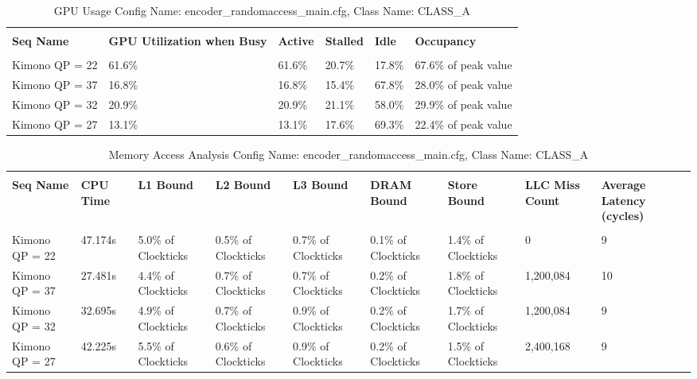 \documentclass{article}%
\begin{document}
\newpage%
\begin{longtabu}{| X[l] | X[l] | X[l] | X[l] | X[l] | X[l] |}%
\caption{%
GPU Usage\newline%
 Config Name: encoder\_randomaccess\_main.cfg,\newline%
 Class Name: CLASS\_A\newline%
%
}%
\hline%
&&&&&\\%
\textbf{Seq Name}&\textbf{GPU Utilization when Busy}&\textbf{Active}&\textbf{Stalled}&\textbf{Idle}&\textbf{Occupancy}\\%
&&&&&\\%
\hline%
\endhead%
Kimono\newline%
 QP = 22&61.6\%&61.6\%&20.7\%&17.8\%&67.6\% of peak value\\%
\hline%
Kimono\newline%
 QP = 37&16.8\%&16.8\%&15.4\%&67.8\%&28.0\% of peak value\\%
\hline%
Kimono\newline%
 QP = 32&20.9\%&20.9\%&21.1\%&58.0\%&29.9\% of peak value\\%
\hline%
Kimono\newline%
 QP = 27&13.1\%&13.1\%&17.6\%&69.3\%&22.4\% of peak value\\%
\hline%
\end{longtabu}%
\begin{longtabu}{| X[l] | X[l] | X[l] | X[l] | X[l] | X[l] | X[l] | X[l] | X[l] |}%
\caption{%
Memory Access Analysis\newline%
 Config Name: encoder\_randomaccess\_main.cfg,\newline%
 Class Name: CLASS\_A\newline%
%
}%
\hline%
&&&&&&&&\\%
\textbf{Seq Name}&\textbf{CPU Time}&\textbf{L1 Bound}&\textbf{L2 Bound}&\textbf{L3 Bound}&\textbf{DRAM Bound}&\textbf{Store Bound}&\textbf{LLC Miss Count}&\textbf{Average Latency (cycles)}\\%
&&&&&&&&\\%
\hline%
\endhead%
Kimono\newline%
 QP = 22&47.174s&5.0\% of Clockticks&0.5\% of Clockticks&0.7\% of Clockticks&0.1\% of Clockticks&1.4\% of Clockticks&0&9\\%
\hline%
Kimono\newline%
 QP = 37&27.481s&4.4\% of Clockticks&0.7\% of Clockticks&0.7\% of Clockticks&0.2\% of Clockticks&1.8\% of Clockticks&1,200,084&10\\%
\hline%
Kimono\newline%
 QP = 32&32.695s&4.9\% of Clockticks&0.7\% of Clockticks&0.9\% of Clockticks&0.2\% of Clockticks&1.7\% of Clockticks&1,200,084&9\\%
\hline%
Kimono\newline%
 QP = 27&42.225s&5.5\% of Clockticks&0.6\% of Clockticks&0.9\% of Clockticks&0.2\% of Clockticks&1.5\% of Clockticks&2,400,168&9\\%
\hline%
\end{longtabu}%
\end{document}
